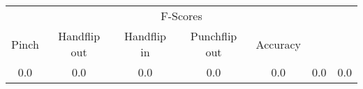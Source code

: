 \documentclass{standalone}
\begin{document}
 
 \begin{tabular}{|c|c|c|c|c|c ||c|}
\cline{1-7}\multicolumn{7}{|c|}{F-Scores} \\ 
\cline{1-7}Pinch & Handflip out & Handflip in & Punchflip out & Accuracy\\ 
\cline{1-7}0.0 & 0.0 & 0.0 & 0.0 & 0.0 & 0.0 & 0.0\\ 
 \cline{1-7}\hline \end{tabular}
 
\end{document}
